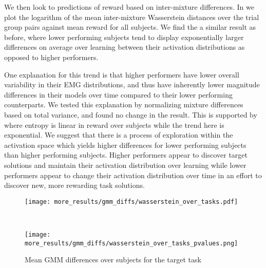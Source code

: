 \documentclass[../main.tex]{subfiles}
\begin{document}
We then look to predictions of reward based on inter-mixture differences. In  we plot the logarithm of the mean inter-mixture Wasserstein distances over the trial group pairs against mean reward for all subjects. We find the a similar result as before, where lower performing subjects tend to display exponentially larger differences on average over learning between their activation distributions as opposed to higher performers. 

One explanation for this trend is that higher performers have lower overall variability in their EMG distributions, and thus have inherently lower magnitude differences in their models over time compared to their lower performing counterparts. We tested this explanation by normalizing mixture differences based on total variance, and found no change in the result. This is supported by  where entropy is linear in reward over subjects while the trend here is exponential. We suggest that there is a process of exploration within the activation space which yields higher differences for lower performing subjects than higher performing subjects. Higher performers appear to discover target solutions and maintain their activation distribution over learning while lower performers appear to change their activation distribution over time in an effort to discover new, more rewarding task solutions.


\begin{figure}[!htb]
  \centering
  \begin{minipage}{\textwidth}
    \texttt{[image: more\_results/gmm\_diffs/wasserstein\_over\_tasks.pdf]}
    \subcaption{}
  \end{minipage}\\%
  \begin{minipage}{0.7\textwidth}
    \centering
    \texttt{[image: more\_results/gmm\_diffs/wasserstein\_over\_tasks\_pvalues.png]}
  \end{minipage}
  \caption[Wasserstein mixture differences over tasks]{Mean GMM differences over subjects for the target task}\label{fig:wasserstein_diffs}
\end{figure}
\end{document}
